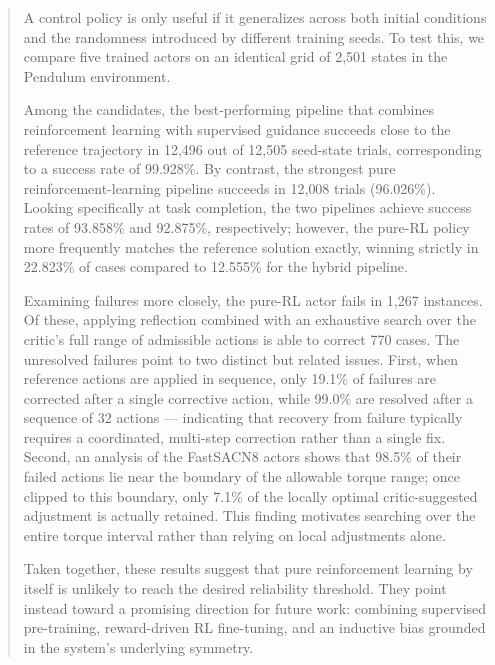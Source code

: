\maketitle
\vspace{-1.5em}

\begin{abstract}
A control policy is only useful if it generalizes across both initial
conditions and the randomness introduced by different training seeds.
To test this, we compare five trained actors on an identical grid of
2{,}501 states in the Pendulum environment.

Among the candidates, the best-performing pipeline that combines
reinforcement learning with supervised guidance succeeds close to the
reference trajectory in 12{,}496 out of 12{,}505 seed-state trials,
corresponding to a success rate of 99.928\%. By contrast, the strongest
pure reinforcement-learning pipeline succeeds in 12{,}008 trials
(96.026\%). Looking specifically at task completion, the two pipelines
achieve success rates of 93.858\% and 92.875\%, respectively; however,
the pure-RL policy more frequently matches the reference solution
exactly, winning strictly in 22.823\% of cases compared to 12.555\%
for the hybrid pipeline.

Examining failures more closely, the pure-RL actor fails in 1{,}267
instances. Of these, applying reflection combined with an exhaustive
search over the critic's full range of admissible actions is able to
correct 770 cases. The unresolved failures point to two distinct but
related issues. First, when reference actions are applied in sequence,
only 19.1\% of failures are corrected after a single corrective action,
while 99.0\% are resolved after a sequence of 32 actions — indicating
that recovery from failure typically requires a coordinated,
multi-step correction rather than a single fix. Second, an analysis of
the FastSACN8 actors shows that 98.5\% of their failed actions lie near
the boundary of the allowable torque range; once clipped to this
boundary, only 7.1\% of the locally optimal critic-suggested
adjustment is actually retained. This finding motivates searching over
the entire torque interval rather than relying on local adjustments
alone.

Taken together, these results suggest that pure reinforcement learning
by itself is unlikely to reach the desired reliability threshold. They
point instead toward a promising direction for future work: combining
supervised pre-training, reward-driven RL fine-tuning, and an inductive
bias grounded in the system's underlying symmetry.
\end{abstract}

